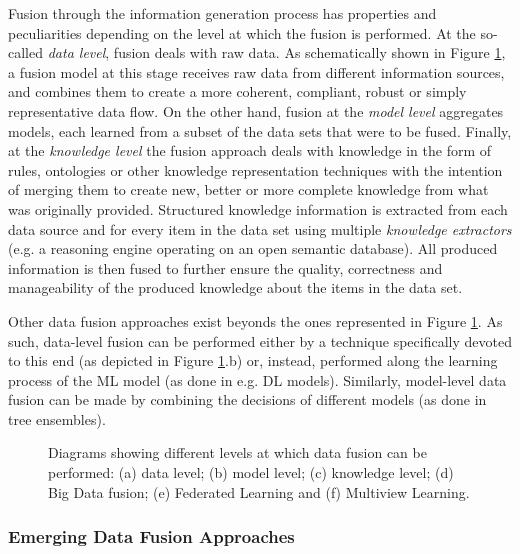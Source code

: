 \documentclass[final]{elsarticle}
\begin{document}
Fusion through the information generation process has properties and peculiarities depending on the level at which the fusion is performed. At the so-called \emph{data level}, fusion deals with raw data. As schematically shown in Figure \ref{fig:fusion_all}, a fusion model at this stage receives raw data from different information sources, and combines them to create a more coherent, compliant, robust or simply representative data flow. On the other hand, fusion at the \emph{model level} aggregates models, each learned from a subset of the data sets that were to be fused. Finally, at the \emph{knowledge level} the fusion approach deals with knowledge in the form of rules, ontologies or other knowledge representation techniques with the intention of merging them to create new, better or more complete knowledge from what was originally provided. Structured knowledge information is extracted from each data source and for every item in the data set using multiple \emph{knowledge extractors} (e.g. a reasoning engine operating on an open semantic database). All produced information is then fused to further ensure the quality, correctness and manageability of the produced knowledge about the items in the data set.

Other data fusion approaches exist beyonds the ones represented in Figure \ref{fig:fusion_all}. As such, data-level fusion can be performed either by a technique specifically devoted to this end (as depicted in Figure \ref{fig:fusion_all}.b) or, instead, performed along the learning process of the ML model (as done in e.g. DL models). Similarly, model-level data fusion can be made by combining the decisions of different models (as done in tree ensembles).
\begin{figure}[ht]
	\caption{Diagrams showing different levels at which data fusion can be performed: (a) data level; (b) model level; (c) knowledge level; (d) Big Data fusion; (e) Federated Learning and (f) Multiview Learning.}
	\label{fig:fusion_all}
\end{figure}

\subsubsection{Emerging Data Fusion Approaches} \label{sssec:advanced_levels_data_fusion}
\end{document}
